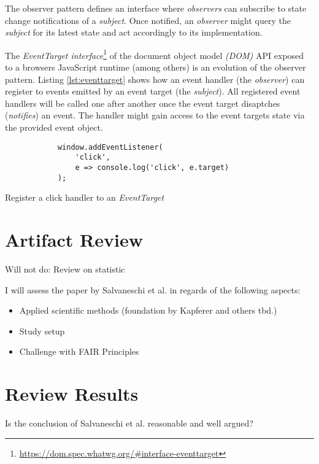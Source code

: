 \documentclass[11pt,a4paper,twocolumn]{article}
\begin{document}
	The observer pattern \cite{gamma1995design} defines an interface where \emph{observers} can subscribe to state change notifications of a \emph{subject}. Once notified, an \emph{observer} might query the \emph{subject} for its latest state and act accordingly to its implementation.

	The \emph{EventTarget interface}\footnote{\url{https://dom.spec.whatwg.org/\#interface-eventtarget}} of the document object model \emph{(DOM)} API exposed to a browsers JavaScript runtime (among others) is an evolution of the observer pattern. Listing \ref{lst:eventtarget} shows how an event handler (the \emph{observer}) can register to events emitted by an event target (the \emph{subject}). All registered event handlers will be called one after another once the event target disaptches (\emph{notifies}) an event. The handler might gain access to the event targets state via the provided event object.


	\begin{listing}[H]
		\begin{verbatim}
			window.addEventListener(
				'click',
				e => console.log('click', e.target)
			);
		\end{verbatim}
		\caption{Register a click handler to an \emph{EventTarget}}
		\label{lst:eventtarget}
	\end{listing}


	\section{Artifact Review}
	Will not do: Review on statistic

	I will assess the paper by Salvaneschi et al. \cite{7827078} in regards of the following aspects:
	\begin{itemize}
		\item Applied scientific methods (foundation by Kapferer \cite{kapferer:2019:empirical} and others tbd.)
		\item Study setup
		\item Challenge with FAIR Principles \cite{2019arXiv190805986H} \cite{wilkinson:2016}
	\end{itemize}



	\section{Review Results}
	Is the conclusion of Salvaneschi et al. \cite{7827078} reasonable and well argued?
\end{document}
